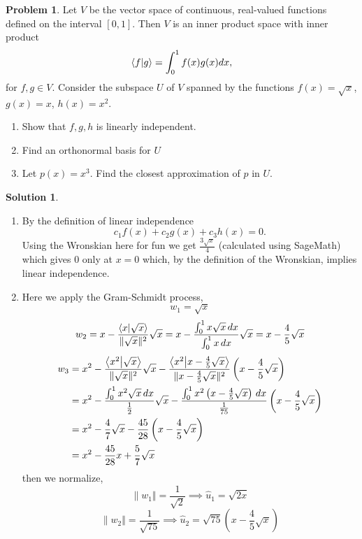\documentclass[10pt]{article}
\theoremstyle{definition}
\newtheorem{problem}{Problem}
\newtheorem{soln}{Solution}
\newcommand{\vlen}[1]{\| {#1}\Vert }
\begin{document}
\begin{problem}
Let $V$ be the vector space of continuous, real-valued functions defined
on the interval $[0, 1]$. Then $V$ is an inner product space with inner
product
$$\braket{f}{g}=\int_{0}^{1}f(x)g(x)dx,$$
for $f,g\in V$. Consider the subspace $U$ of $V$ spanned by the functions $f(x)=\sqrt{x}$, $g(x)=x$, $h(x)=x^2$.
\begin{enumerate}[label=(\alph*)]
  \item Show that $f, g, h$ is linearly independent.
  \item Find an orthonormal basis for $U$
  \item Let $p(x)=x^3$. Find the closest approximation of $p$ in $U$.
\end{enumerate}
\end{problem}
\begin{soln}~
  \begin{enumerate}[label=(\alph*)]
    \item By the definition of linear independence
          $$c_1f(x)+c_2g(x)+c_3h(x)=0.$$
          Using the Wronskian here for fun we get $\frac{3\sqrt{x}}{4}$ (calculated using SageMath) which gives $0$ only at $x=0$ which, by the definition of the Wronskian, implies
          linear independence.
    \item Here we apply the Gram-Schmidt process,
          $$w_1=\sqrt{x}$$
          $$w_2=x-\frac{\braket{x}{\sqrt{x}}}{\vlen{\sqrt{x}}^2}\sqrt{x}=x-\frac{\int_{0}^{1}x\sqrt{x}\,dx}{\int_{0}^{1}x\,dx}\sqrt{x}=x-\frac{4}{5}\sqrt{x}$$
          \begin{align*}
            w_3 & =x^2-\frac{\braket{x^2}{\sqrt{x}}}{\vlen{\sqrt{x}}^2}\sqrt{x}-\frac{\braket{x^2}{x-\frac{4}{5}\sqrt{x}}}{\vlen{x-\frac{4}{5}\sqrt{x}}^2}\left(x-\frac{4}{5}\sqrt{x}\right) \\
                & =x^2-\frac{\int_{0}^{1}x^2\sqrt{x}\,dx}{\frac{1}{2}}\sqrt{x}-\frac{\int_{0}^{1}x^2\left(x-\frac{4}{5}\sqrt{x}\right)\,dx}{\frac{1}{75}}\left(x-\frac{4}{5}\sqrt{x}\right)  \\
                & =x^2-\frac{4}{7}\sqrt{x}-\frac{45}{28}\left(x-\frac{4}{5}\sqrt{x}\right)                                                                                                   \\
                & =x^2-\frac{45}{28}x+\frac{5}{7}\sqrt{x}
          \end{align*}
          then we normalize,
          $$\vlen{w_1}=\frac{1}{\sqrt{2}}\implies\hat{u}_1=\sqrt{2x}$$
          $$\vlen{w_2}=\frac{1}{\sqrt{75}}\implies\hat{u}_2=\sqrt{75}\left(x-\frac{4}{5}\sqrt{x}\right)$$

\end{enumerate}
\end{soln}
\end{document}
